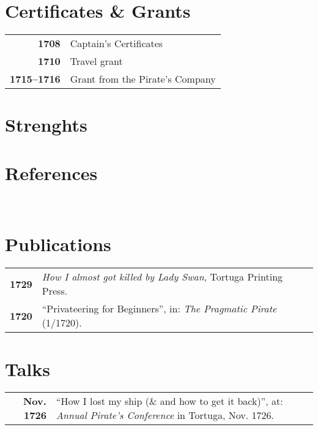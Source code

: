 \documentclass[grey]{hipstercv}
\begin{document}
\begin{paracol}{2}
\begin{minipage}[t]{0.16\textwidth}
 \hspace{1em}
\end{minipage}

\vspace{4em}

\begin{minipage}[t]{0.3\textwidth}
\section*{Certificates \& Grants}
\begin{tabular}{>{\footnotesize\bfseries}r >{\footnotesize}p{}}
    1708 & Captain's Certificates \\
    1710 & Travel grant \\
    1715--1716 & Grant from the Pirate's Company
\end{tabular}
\section*{Strenghts}
\section*{References}
 \\

\end{minipage}\hfill
\begin{minipage}[t]{0.3\textwidth}
\section*{Publications}
\begin{tabular}{>{\footnotesize\bfseries}r >{\footnotesize}p{}}
    1729 & \emph{How I almost got killed by Lady Swan}, Tortuga Printing Press. \\
    1720 & ``Privateering for Beginners'', in: \emph{The Pragmatic Pirate} (1/1720).
\end{tabular}
\section*{Talks}
\begin{tabular}{>{\footnotesize\bfseries}r >{\footnotesize}p{}}
    Nov. 1726 & ``How I lost my ship (\& and how to get it back)'', at: \emph{Annual Pirate's Conference} in Tortuga, Nov. 1726.
\end{tabular}
\end{minipage}










\end{paracol}
\end{document}
